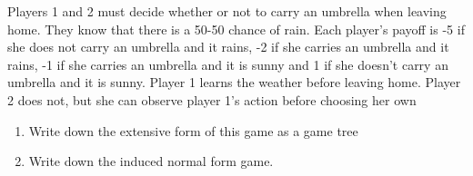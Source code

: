 \documentclass[../main.tex]{subfiles}
\begin{document}
\begin{question}[Rain]
Players 1 and 2 must decide whether or not to carry an umbrella when leaving home. They know that there is a 50-50 chance of rain. Each player's payoff is -5 if she does not carry an umbrella and it rains, -2 if she carries an umbrella and it rains, -1 if she carries an umbrella and it is sunny and 1 if she doesn't carry an umbrella and it is sunny. Player 1 learns the weather before leaving home. Player 2 does not, but she can observe player 1's action before choosing her own
\begin{enumerate}
\item Write down the extensive form of this game as a game tree
\item Write down the induced normal form game.
\end{enumerate}
\end{question}
\end{document}
